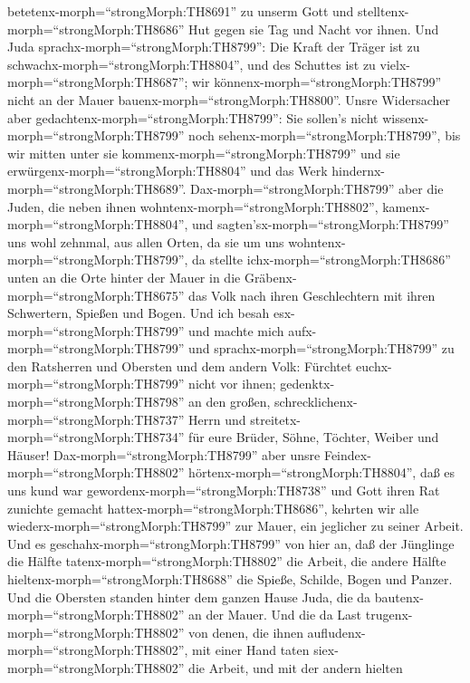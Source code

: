 betetenx-morph=``strongMorph:TH8691'' zu unserm Gott und
stelltenx-morph=``strongMorph:TH8686'' Hut gegen sie Tag und Nacht vor
ihnen.  Und Juda sprachx-morph=``strongMorph:TH8799'': Die
Kraft der Träger ist zu schwachx-morph=``strongMorph:TH8804'', und des
Schuttes ist zu vielx-morph=``strongMorph:TH8687''; wir
könnenx-morph=``strongMorph:TH8799'' nicht an der Mauer
bauenx-morph=``strongMorph:TH8800''.  Unsre Widersacher
aber gedachtenx-morph=``strongMorph:TH8799'': Sie sollen's nicht
wissenx-morph=``strongMorph:TH8799'' noch
sehenx-morph=``strongMorph:TH8799'', bis wir mitten unter sie
kommenx-morph=``strongMorph:TH8799'' und sie
erwürgenx-morph=``strongMorph:TH8804'' und das Werk
hindernx-morph=``strongMorph:TH8689''. 
Dax-morph=``strongMorph:TH8799'' aber die Juden, die neben ihnen
wohntenx-morph=``strongMorph:TH8802'',
kamenx-morph=``strongMorph:TH8804'', und
sagten'sx-morph=``strongMorph:TH8799'' uns wohl zehnmal, aus allen
Orten, da sie um uns wohntenx-morph=``strongMorph:TH8799'',
 da stellte ichx-morph=``strongMorph:TH8686'' unten an die
Orte hinter der Mauer in die Gräbenx-morph=``strongMorph:TH8675'' das
Volk nach ihren Geschlechtern mit ihren Schwertern, Spießen und Bogen.
 Und ich besah esx-morph=``strongMorph:TH8799'' und machte
mich aufx-morph=``strongMorph:TH8799'' und
sprachx-morph=``strongMorph:TH8799'' zu den Ratsherren und Obersten und
dem andern Volk: Fürchtet euchx-morph=``strongMorph:TH8799'' nicht vor
ihnen; gedenktx-morph=``strongMorph:TH8798'' an den großen,
schrecklichenx-morph=``strongMorph:TH8737'' Herrn und
streitetx-morph=``strongMorph:TH8734'' für eure Brüder, Söhne, Töchter,
Weiber und Häuser!  Dax-morph=``strongMorph:TH8799'' aber
unsre Feindex-morph=``strongMorph:TH8802''
hörtenx-morph=``strongMorph:TH8804'', daß es uns kund war
gewordenx-morph=``strongMorph:TH8738'' und Gott ihren Rat zunichte
gemacht hattex-morph=``strongMorph:TH8686'', kehrten wir alle
wiederx-morph=``strongMorph:TH8799'' zur Mauer, ein jeglicher zu seiner
Arbeit.  Und es geschahx-morph=``strongMorph:TH8799'' von
hier an, daß der Jünglinge die Hälfte
tatenx-morph=``strongMorph:TH8802'' die Arbeit, die andere Hälfte
hieltenx-morph=``strongMorph:TH8688'' die Spieße, Schilde, Bogen und
Panzer. Und die Obersten standen hinter dem ganzen Hause Juda,
 die da bautenx-morph=``strongMorph:TH8802'' an der Mauer.
Und die da Last trugenx-morph=``strongMorph:TH8802'' von denen, die
ihnen aufludenx-morph=``strongMorph:TH8802'', mit einer Hand taten
siex-morph=``strongMorph:TH8802'' die Arbeit, und mit der andern hielten
